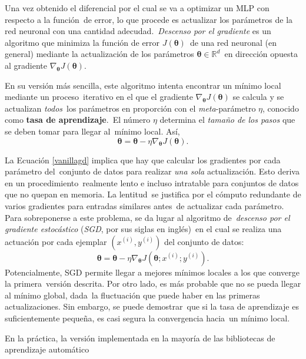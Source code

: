 \noindent
Una vez obtenido el diferencial por el cual se va a optimizar un MLP con respecto a la función\
de error, lo que procede es actualizar los parámetros de la red neuronal con una cantidad adecudad.\
\emph{Descenso por el gradiente} es un algoritmo que minimiza la función de error $J(\bm{\theta})$\
de una red neuronal (en general) mediante la actualización de los parámetros $\bm{\theta} \in \mathbb{R}^d$\
en dirección opuesta al gradiente $\nabla_{\bm{\theta}}J(\bm{\theta})$.\par
En su versión más sencilla, este algoritmo intenta encontrar un mínimo local mediante un proceso\
iterativo en el que el gradiente $\nabla_{\bm{\theta}}J(\bm{\theta})$ se calcula y se actualizan \emph{todos}\
los parámetros en proporción con el \emph{meta}-parámetro $\eta$, conocido como \textbf{tasa de aprendizaje}.\
El número $\eta$ determina el \textit{tamaño de los pasos} que se deben tomar para llegar al\
mínimo local. Así,
\begin{equation}
  \bm{\theta} = \bm{\theta} - \eta \nabla_{\bm{\theta}}J(\bm{\theta}). \label{vanillagd}
\end{equation}\par
La Ecuación \ref{vanillagd} implica que hay que calcular los gradientes por cada parámetro del\
conjunto de datos para realizar \emph{una sola} actualización. Esto deriva en un procedimiento\
realmente lento e incluso intratable para conjuntos de datos que no quepan en memoria. La lentitud\
se justifica por el cómputo redundante de varios gradientes para entradas similares antes\
de actualizar cada parámetro. Para sobreponerse a este problema, se da lugar al algoritmo de\
\emph{descenso por el gradiente estocástico} (\emph{SGD}, por sus siglas en inglés)\
en el cual se realiza una actuación por cada ejemplar $(x^{(i)}, y^{(i)})$ del conjunto de datos:
\begin{equation}
  \bm{\theta} = \bm{\theta} - \eta \nabla_{\bm{\theta}}J(\bm{\theta}; x^{(i)}; y^{(i)}). \label{sgd}
\end{equation}
Potencialmente, SGD permite llegar a mejores mínimos locales a los que converge la primera\
versión descrita. Por otro lado, es más probable que no se pueda llegar al mínimo global, dada\
la fluctuación que puede haber en las primeras actualizaciones. Sin embargo, se puede demostrar\
que si la tasa de aprendizaje es suficientemente pequeña, es casi segura la convergencia hacia\
un mínimo local.\par
En la práctica, la versión implementada en la mayoría de las bibliotecas de aprendizaje automático\
